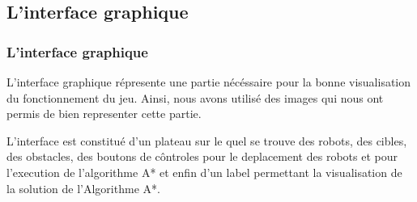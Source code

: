 \documentclass{beamer}
\begin{document}
	\subsection{L’interface graphique}
	\begin{frame}
		\frametitle{L’interface graphique}
		
		L'interface graphique répresente une partie nécéssaire pour la bonne visualisation du fonctionnement du jeu. Ainsi, nous avons utilisé des images qui nous ont permis de bien representer cette partie.
		
		L'interface est constitué d'un plateau sur le quel se trouve des robots, des cibles, des obstacles, des boutons de côntroles pour le deplacement des robots et pour l'execution de l'algorithme A* et enfin d'un label permettant la visualisation de la solution de l'Algorithme A*.
		
	\end{frame}
\end{document}
